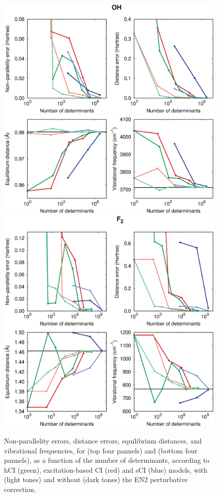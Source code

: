 \documentclass[aip,jcp,reprint,noshowkeys,superscriptaddress]{revtex4-1}
\begin{document}
\begin{figure}%
\includegraphics[width=1.0\linewidth]{plot_oh_rpt2}
\includegraphics[width=1.0\linewidth]{plot_f2_rpt2}
\caption{
Non-parallelity errors, distance errors, equilibrium distances, and vibrational frequencies, for  (top four pannels) and  (bottom four pannels),
as a function of the number of determinants, according to hCI (green), excitation-based CI (red) and sCI (blue) models,
with (light tones) and without (dark tones) the EN2 perturbative correction.
}
\label{fig:plot_rpt2}
\end{figure}
\end{document}
